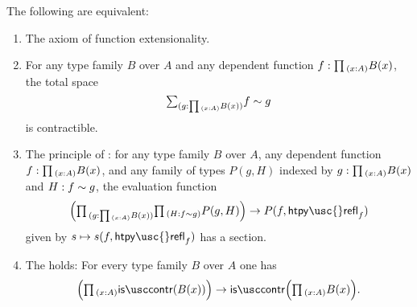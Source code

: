 \begin{thm}\label{thm:funext_wkfunext}
The following are equivalent:
\begin{enumerate}
\item The axiom of function extensionality.
\item For any type family $B$ over $A$ and any dependent function $f:\prd{x:A}B(x)$, the total space
  \begin{equation*}
    \sm{g:\prd{x:A}B(x)}f\htpy g
  \end{equation*}
  is contractible.
\item
  The principle of :
  for any type family $B$ over $A$, any dependent function $f:\prd{x:A}B(x)$, and any family of types $P(g,H)$ indexed by $g:\prd{x:A}B(x)$ and $H:f\sim g$, the evaluation function
\begin{equation*}
\Big(\prd{g:\prd{x:A}B(x)}{H:f\htpy g}P(g,H)\Big)\to P(f,\mathsf{htpy\usc{}refl}_f)
\end{equation*}
given by $s\mapsto s(f,\mathsf{htpy\usc{}refl}_f)$ has a section.
\item The  holds: For every type family $B$ over $A$ one has
\begin{equation*}
\Big(\prd{x:A}\iscontr(B(x))\Big)\to\iscontr\Big(\prd{x:A}B(x)\Big).
\end{equation*}
\end{enumerate}
\end{thm}

